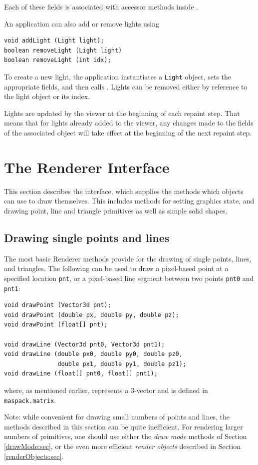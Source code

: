 Each of these fields is associated with accessor methods inside
.

An application can also add or remove lights using
%
\begin{lstlisting}[]
void addLight (Light light);
boolean removeLight (Light light)
boolean removeLight (int idx);
\end{lstlisting}
%
To create a new light, the application instantiates a {\tt Light}
object, sets the appropriate fields, and then calls
. Lights can be
removed either by reference to the light object or its index.

\begin{sideblock}
Lights are updated by the viewer at the beginning of each repaint
step. That means that for lights already added to the viewer, any
changes made to the fields of the associated
 object will take effect
at the beginning of the next repaint step.
\end{sideblock}

\section{The Renderer Interface}
\label{rendererInterface:sec}

This section describes the 
interface, which supplies the methods which objects can use to draw
themselves. This includes methods for setting graphics state, and
drawing point, line and triangle primitives as well as simple solid
shapes.

\subsection{Drawing single points and lines}
\label{singlePointsLines:sec}

The most basic Renderer methods provide for the drawing of single
points, lines, and triangles. The following can be used to
draw a pixel-based point at a specified location {\tt pnt}, or a
pixel-based line segment between two points {\tt pnt0} and {\tt pnt1}:
%
\begin{lstlisting}[]
void drawPoint (Vector3d pnt);
void drawPoint (double px, double py, double pz);
void drawPoint (float[] pnt);

void drawLine (Vector3d pnt0, Vector3d pnt1);
void drawLine (double px0, double py0, double pz0, 
               double px1, double py1, double pz1);
void drawLine (float[] pnt0, float[] pnt1);
\end{lstlisting}
%
where, as mentioned earlier,  
represents a 3-vector and is defined in {\tt maspack.matrix}.
\begin{sideblock}
Note: while convenient for drawing small numbers of points and lines,
the methods described in this section can be quite inefficient. For
rendering larger numbers of primitives, one should use either the {\it
draw mode} methods of Section \ref{drawMode:sec}, or the even more
efficient {\it render objects} described in Section
\ref{renderObjects:sec}.
\end{sideblock}

